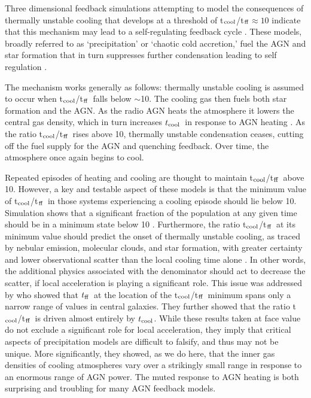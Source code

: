 \documentclass[twocolumn]{aastex6}
\newcommand{\tctff}{{t$_{\rm cool}$/t$_{\rm ff}$}}
\newcommand{\tc}{$t_{\rm cool}$}
\newcommand{\tff}{$t_{\rm ff}$}
\begin{document}
Three dimensional feedback simulations attempting to model the consequences of thermally unstable cooling that develops at a threshold of \tctff$\approx 10$ indicate that this mechanism may lead to a self-regulating feedback cycle \cite[][]{Gaspari12,Gaspari13,Prasad15,Li14a,Li15,Meece15,Singh15,Gaspari15}. These models, broadly referred to as ‘precipitation’ or ‘chaotic cold accretion,’ fuel the AGN and star formation that in turn suppresses further condensation leading to self regulation \cite[][]{Pizzolato05,Pizzolato10,Gaspari12,Li14a}.  

The mechanism works generally as follows:  thermally unstable cooling is assumed to occur when \tctff\ falls below $\sim$10.   The cooling gas then fuels both star formation and the AGN. As the radio AGN heats the atmosphere it lowers the central gas density, which in turn increases \tc\ in response to AGN heating \cite[e.g.][]{Li15,Voit15a}.  As the ratio \tctff\ rises above 10, thermally unstable condensation ceases, cutting off the fuel supply for the AGN and quenching feedback.  Over time, the atmosphere once again begins to cool.  

Repeated episodes of heating and cooling are thought to maintain \tctff\ above 10.  However, a key and testable aspect of these models is that the minimum value of \tctff\ in those systems experiencing a cooling episode should lie below 10.  Simulation shows that a significant fraction of the population at any given time should be in a minimum state below 10 \cite[e.g.][]{Li15}.  Furthermore, the ratio \tctff\ at its minimum value should predict the onset of thermally unstable cooling, as traced by nebular emission, molecular clouds, and star formation, with greater certainty and lower observational scatter than the local cooling time alone \cite[e.g.][]{Rafferty08}.  In other words, the additional physics associated with the denominator should act to decrease the scatter, if local acceleration is playing a significant role.  
This issue was addressed by \citet[][]{McNamara16} who showed that \tff\ at the location of the \tctff\ minimum spans only a narrow range of values in central galaxies.  They further showed that the ratio \tctff\ is driven almost entirely by \tc.  While these results taken at face value do not exclude a significant role for local acceleration, they imply that critical aspects of precipitation models are difficult to falsify, and thus may not be unique.  More significantly, they showed, as we do here,  that the inner gas densities of cooling atmospheres vary over a strikingly small range in response to an enormous  range of AGN power.  The muted response to AGN heating is both surprising and troubling for many AGN feedback models.
\end{document}
